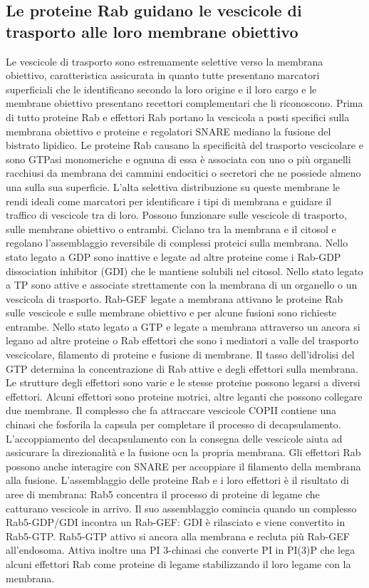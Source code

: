 \subsection{Le proteine Rab guidano le vescicole di trasporto alle loro membrane obiettivo}
Le vescicole di trasporto sono estremamente selettive verso la membrana obiettivo, caratteristica assicurata in quanto tutte presentano marcatori superficiali che le identificano 
secondo la loro origine e il loro cargo e le membrane obiettivo presentano recettori complementari che li riconoscono. Prima di tutto proteine Rab e effettori Rab portano la 
vescicola a posti specifici sulla membrana obiettivo e proteine e regolatori SNARE mediano la fusione del bistrato lipidico. Le proteine Rab causano la specificit\`a del trasporto
vescicolare e sono GTPasi monomeriche e ognuna di essa \`e associata con uno o pi\`u organelli racchiusi da membrana dei cammini endocitici o secretori che ne possiede almeno una sulla
sua superficie. L'alta selettiva distribuzione su queste membrane le rendi ideali come marcatori per identificare i tipi di membrana e guidare il traffico di vescicole tra di loro. 
Possono funzionare sulle vescicole di trasporto, sulle membrane obiettivo o entrambi. Ciclano tra la membrana e il citosol e regolano l'assemblaggio reversibile di complessi proteici
sulla membrana. Nello stato legato a GDP sono inattive e  legate ad altre proteine come i Rab-GDP dissociation inhibitor (GDI) che le mantiene solubili nel citosol. Nello stato legato
a TP sono attive e associate strettamente con la membrana di un organello o un vescicola di trasporto. Rab-GEF legate a membrana attivano le proteine Rab sulle vescicole e sulle
membrane obiettivo e per alcune fusioni sono richieste entrambe. Nello stato legato a GTP e legate a membrana attraverso un ancora si legano ad altre proteine o Rab effettori che
sono i mediatori a valle del trasporto vescicolare, filamento di proteine e fusione di membrane. Il tasso dell'idrolisi del GTP determina la concentrazione di Rab attive e degli 
effettori sulla membrana. Le strutture degli effettori sono varie e le stesse proteine possono legarsi a diversi effettori. Alcuni effettori sono proteine motrici, altre leganti
che possono collegare due membrane. Il complesso che fa attraccare vescicole COPII contiene una chinasi che fosforila la capsula per completare il processo di decapsulamento. 
L'accoppiamento del decapsulamento con la consegna delle vescicole aiuta ad assicurare la direzionalit\`a e la fusione ocn la propria membrana. Gli effettori Rab possono anche 
interagire con SNARE per accoppiare il filamento della membrana alla fusione. L'assemblaggio delle proteine Rab e i loro effettori \`e il risultato di aree di membrana: Rab5 concentra il
processo di proteine di legame che catturano vescicole in arrivo. Il suo assemblaggio comincia quando un complesso Rab5-GDP/GDI incontra un Rab-GEF: GDI \`e rilasciato e viene convertito
in Rab5-GTP. Rab5-GTP attivo si ancora alla membrana e recluta pi\`u Rab-GEF all'endosoma. Attiva inoltre una PI 3-chinasi che converte PI in PI(3)P che lega alcuni effettori Rab come
proteine di legame stabilizzando il loro legame con la membrana.
